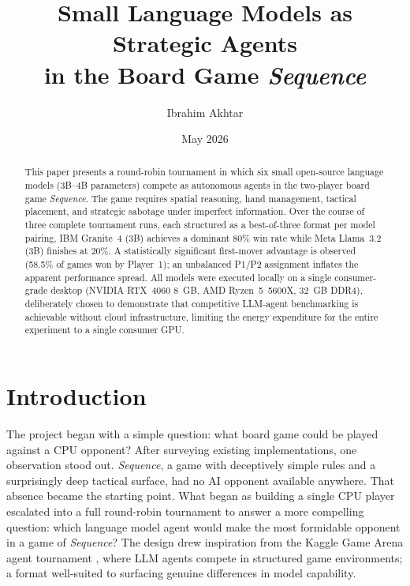 \documentclass[11pt]{article}
\title{\bfseries Small Language Models as Strategic Agents\\in the Board Game \textit{Sequence}}
\author{Ibrahim Akhtar}
\date{May 2026}
\begin{document}
\maketitle

\begin{abstract}
This paper presents a round-robin tournament in which six small open-source language models (3B--4B parameters) compete as autonomous agents in the two-player board game \textit{Sequence}. The game requires spatial reasoning, hand management, tactical placement, and strategic sabotage under imperfect information. Over the course of three complete tournament runs, each structured as a best-of-three format per model pairing, IBM Granite~4 (3B) achieves a dominant 80\% win rate while Meta Llama~3.2 (3B) finishes at 20\%. A statistically significant first-mover advantage is observed (58.5\% of games won by Player~1); an unbalanced P1/P2 assignment inflates the apparent performance spread. All models were executed locally on a single consumer-grade desktop (NVIDIA RTX~4060 8~GB, AMD Ryzen~5~5600X, 32~GB DDR4), deliberately chosen to demonstrate that competitive LLM-agent benchmarking is achievable without cloud infrastructure, limiting the energy expenditure for the entire experiment to a single consumer GPU.
\end{abstract}

\section{Introduction}

The project began with a simple question: what board game could be played against a CPU opponent? After surveying existing implementations, one observation stood out. \textit{Sequence}, a game with deceptively simple rules and a surprisingly deep tactical surface, had no AI opponent available anywhere. That absence became the starting point. What began as building a single CPU player escalated into a full round-robin tournament to answer a more compelling question: which language model agent would make the most formidable opponent in a game of \textit{Sequence}? The design drew inspiration from the Kaggle Game Arena agent tournament \cite{kaggle_arena}, where LLM agents compete in structured game environments; a format well-suited to surfacing genuine differences in model capability.
\end{document}
